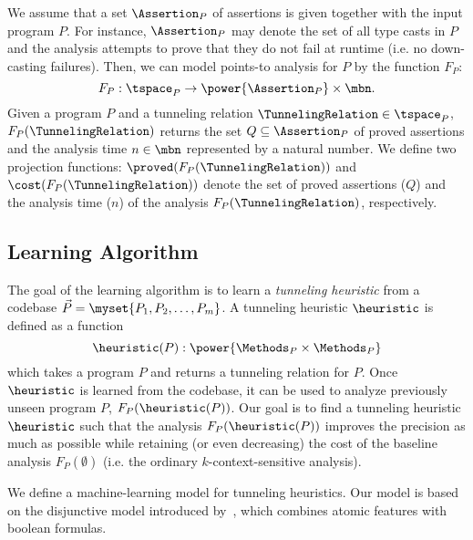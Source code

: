 
We assume that a set $\Assertion_P$ of assertions is given together
with the input program $P$.  For instance, $\Assertion_P$ may denote the set of all type casts in
$P$ and the analysis attempts to prove that they do not fail at
runtime (i.e. no down-casting failures).  Then,
we can model points-to analysis for $P$ by the function $F_P$:
\[
F_P : \tspace_P \to \power{\Assertion_P} \times \mbn.
\]
Given a program $P$ and a tunneling relation $\TunnelingRelation \in \tspace_P$,
$F_P(\TunnelingRelation)$ returns the set $Q \subseteq \Assertion_P$ of proved
assertions and the analysis time $n \in \mbn$ represented by a natural
number.
We define two projection functions:
$\proved(F_P(\TunnelingRelation))$ and $\cost(F_P(\TunnelingRelation))$ denote the set of
proved assertions ($Q$) and the analysis time ($n$) of the analysis
$F_P(\TunnelingRelation)$, respectively.



\subsection{Learning Algorithm}\label{sec:goal}


The goal of the learning algorithm is to learn a {\em tunneling
  heuristic} from a codebase $\vec{P} = \myset{P_1,P_2,\dots,P_m}$.  A
tunneling heuristic $\heuristic$ is defined as a function
\[
\heuristic(P) : \power{\Methods_P \times \Methods_P}
\]
which takes a program $P$ and returns a tunneling relation for $P$.  Once
$\heuristic$ is learned from the codebase, it can be used to analyze
previously unseen program $P$,  $F_P (\heuristic(P))$.
Our goal is to find a tunneling heuristic $\heuristic$ such that
the analysis $F_P(\heuristic(P))$ improves the precision as
much as possible while retaining (or even decreasing) the cost of the baseline
analysis $F_P(\emptyset)$ (i.e. the ordinary $k$-context-sensitive analysis).


We define a machine-learning model for tunneling
heuristics. Our model is based on
the disjunctive model introduced
by~\citet{JeJeChOh17}, which combines atomic
features with boolean formulas.

